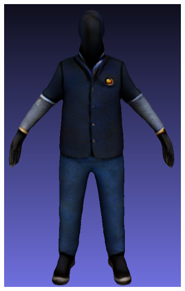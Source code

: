 \begin{figure}[ht]
\begin{subfigure}[b]{0.172\textwidth}
        \includegraphics[width=\textwidth]{figures/appendix/bias_poor_genie_3.png}
        \caption{}
    \end{subfigure}
    \begin{subfigure}[b]{0.175\textwidth}
        \centering

\end{subfigure}
\end{figure}
